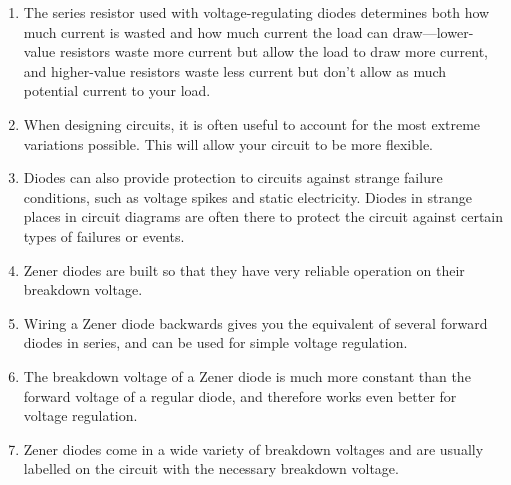 \begin{enumerate}
\item The series resistor used with voltage-regulating diodes determines both how much current is wasted and how much current the load can draw---lower-value resistors waste more current but allow the load to draw more current, and higher-value resistors waste less current but don't allow as much potential current to your load.
\item When designing circuits, it is often useful to account for the most extreme variations possible.  This will allow your circuit to be more flexible.
\item Diodes can also provide protection to circuits against strange failure conditions, such as voltage spikes and static electricity.  Diodes in strange places in circuit diagrams are often there to protect the circuit against certain types of failures or events.
\item Zener diodes are built so that they have very reliable operation on their breakdown voltage.  
\item Wiring a Zener diode backwards gives you the equivalent of several forward diodes in series, and can be used for simple voltage regulation.
\item The breakdown voltage of a Zener diode is much more constant than the forward voltage of a regular diode, and therefore works even better for voltage regulation.
\item Zener diodes come in a wide variety of breakdown voltages and are usually labelled on the circuit with the necessary breakdown voltage.
\end{enumerate}

\applysection

